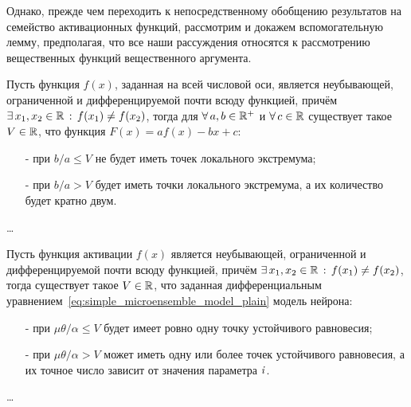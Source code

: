 Однако, прежде чем переходить к непосредственному обобщению результатов на семейство активационных функций, рассмотрим и докажем вспомогательную лемму, предполагая, что все наши рассуждения относятся к рассмотрению вещественных функций вещественного аргумента.
\begin{Lemma}
    Пусть функция $f(x)$, заданная на всей числовой оси, является неубывающей, ограниченной и дифференцируемой почти всюду функцией, причём $\exists\, x_{1}, x_{2} \in \mathbb{R} \,:\, f(x_{1}) \ne f(x_{2})$, тогда для $\forall\,a,b \in \mathbb{R}^{+}$ и $\forall\,c \in \mathbb{R}$ существует такое $V \in \mathbb{R}$, что функция $F(x) = a f(x) - b x + c$:
    \begin{itemize}
        \item[-] при $b/a \le V$ не будет иметь точек локального экстремума;
        \item[-] при $b/a > V$ будет иметь точки локального экстремума, а их количество будет кратно двум.
    \end{itemize}
\end{Lemma}
\begin{Proof}
    \ldots
\end{Proof}

\begin{Theorem}
    Пусть функция активации $f(x)$ является неубывающей, ограниченной и дифференцируемой почти всюду функцией, причём $\exists\, x_{1}, x_{2} \in \mathbb{R} \,:\, f(x_{1}) \ne f(x_{2})$, тогда существует такое $V \in \mathbb{R}$, что заданная дифференциальным уравнением~\eqref{eq:simple_microensemble_model_plain} модель нейрона:
    \begin{itemize}
        \item[-] при $\mu \theta / \alpha \le V$ будет имеет ровно одну точку устойчивого равновесия;
        \item[-] при $\mu \theta / \alpha > V$ может иметь одну или более точек устойчивого равновесия, а их точное число зависит от значения параметра $\mathit{i}$.
    \end{itemize}
\end{Theorem}
\begin{Proof}
    \ldots
\end{Proof}


